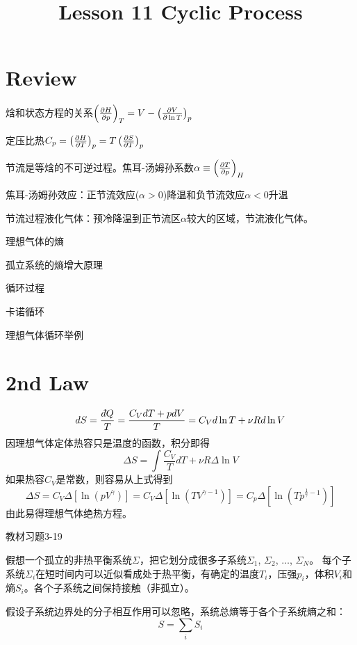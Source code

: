 \documentclass[CJK]{beamer}
\title{Lesson 11 Cyclic Process}
\author{}
\date{}
\begin{document}

\section{Review}

\begin{frame}
\bch 
\bitem
\item{焓和状态方程的关系$\left(\frac{\partial H}{\partial p}\right)_{T} = V - \left(\frac{\partial V}{\partial \ln T}\right)_{p}$}
\item{定压比热$C_p = \left(\frac{\partial H}{\partial T}\right)_{p} = T\left(\frac{\partial S}{\partial T}\right)_{p}$}
\item{节流是等焓的不可逆过程。焦耳-汤姆孙系数$\alpha \equiv \left(\frac{\partial T}{\partial p}\right)_{H}$}
\item{焦耳-汤姆孙效应：正节流效应($\alpha >0$)降温和负节流效应$\alpha<0$升温}
\item{节流过程液化气体：预冷降温到正节流区$\alpha$较大的区域，节流液化气体。}
\eitem
\ech
\end{frame}

\begin{frame}
\bch
\bitem
\item{理想气体的熵}
\item{孤立系统的熵增大原理}
\item{循环过程}
\item{卡诺循环}
\item{理想气体循环举例}
\eitem
\ech
\end{frame}

\section{2nd Law}

\begin{frame}
\bch
{\blue
$$ dS = \frac{\dbar Q}{T} = \frac{C_VdT +  p dV}{T} = C_Vd\ln T+ \nu R d\ln V $$}
因理想气体定体热容只是温度的函数，积分即得
$$\Delta S = \int \frac{C_V}{T} dT + \nu R \Delta \ln V$$
如果热容$C_V$是常数，则容易从上式得到
$$ \Delta S = C_V \Delta \left[\ln\left(pV^\gamma\right) \right] = C_V \Delta \left[\ln\left(TV^{\gamma-1}\right) \right] = C_p \Delta \left[\ln\left(Tp^{\frac{1}{\gamma}-1}\right) \right]$$
由此易得理想气体绝热方程。
\ech
\end{frame}

\begin{frame}
\bch
教材习题3-19
\ech
\end{frame}


\begin{frame}
\bch
假想一个孤立的非热平衡系统$\Sigma$，把它划分成很多子系统$\Sigma_1$, $\Sigma_2$, $\ldots$, $\Sigma_N$。
每个子系统$\Sigma_i$在短时间内可以近似看成处于热平衡，有确定的温度$T_i$，压强$p_i$，体积$V_i$和熵$S_i$。各个子系统之间保持接触（非孤立）。

\skiplines


假设子系统边界处的分子相互作用可以忽略，系统总熵等于各个子系统熵之和：
$$S = \sum_i S_i$$
\ech
\end{frame}
\end{document}
